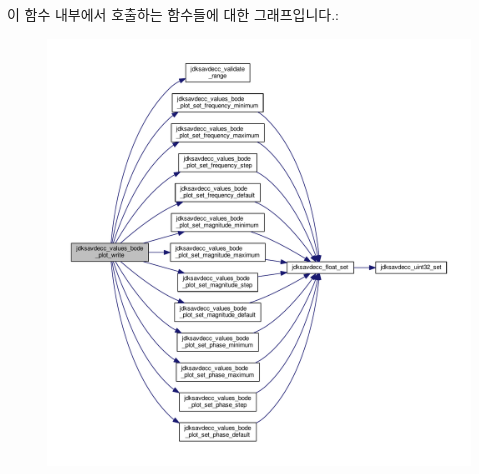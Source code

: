 이 함수 내부에서 호출하는 함수들에 대한 그래프입니다.\+:
\nopagebreak
\begin{figure}[H]
\begin{center}
\leavevmode
\includegraphics[width=350pt]{group__values__bode__plot_ga754c78e43703858da2e5fc0424166753_cgraph}
\end{center}
\end{figure}


